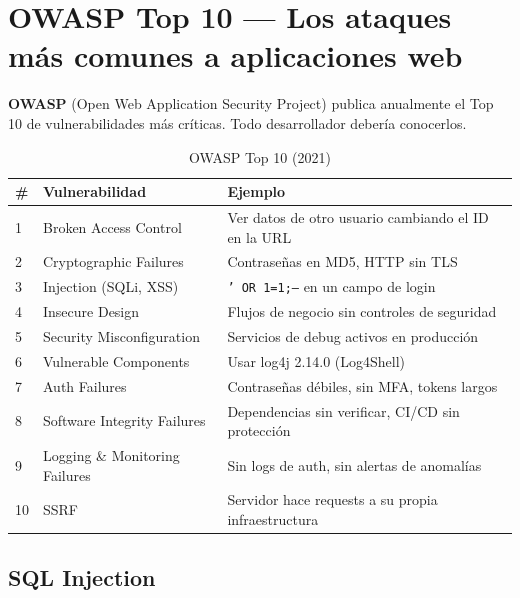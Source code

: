 \section{ OWASP Top 10 --- Los ataques más comunes a aplicaciones web}

\begin{concepto}
\textbf{OWASP} (Open Web Application Security Project) publica anualmente
el Top 10 de vulnerabilidades más críticas. Todo desarrollador debería
conocerlos.
\end{concepto}

\begin{table}[h!]
\centering
\renewcommand{\arraystretch}{1.3}
\begin{tabular}{lll}
\toprule
\textbf{\#} & \textbf{Vulnerabilidad} & \textbf{Ejemplo} \\
\midrule
1 & Broken Access Control       & Ver datos de otro usuario cambiando el ID en la URL \\
2 & Cryptographic Failures      & Contraseñas en MD5, HTTP sin TLS \\
3 & Injection (SQLi, XSS)       & \texttt{' OR 1=1;--} en un campo de login \\
4 & Insecure Design             & Flujos de negocio sin controles de seguridad \\
5 & Security Misconfiguration   & Servicios de debug activos en producción \\
6 & Vulnerable Components       & Usar log4j 2.14.0 (Log4Shell) \\
7 & Auth Failures               & Contraseñas débiles, sin MFA, tokens largos \\
8 & Software Integrity Failures & Dependencias sin verificar, CI/CD sin protección \\
9 & Logging \& Monitoring Failures & Sin logs de auth, sin alertas de anomalías \\
10 & SSRF                       & Servidor hace requests a su propia infraestructura \\
\bottomrule
\end{tabular}
\caption{OWASP Top 10 (2021)}
\end{table}

\subsection{SQL Injection}

